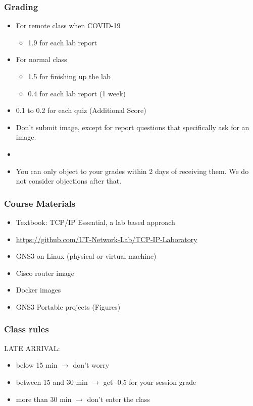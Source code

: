 \documentclass[15pt]{beamer}
\begin{document}
\begin{frame}
    \frametitle{Grading}

    \begin{itemize}
        \item For remote class when COVID-19
        \begin{itemize}
            \item {\color{red} 1.9} for each lab report
        \end{itemize}
        \item For normal class
        \begin{itemize}
            \item {\color{red} 1.5} for finishing up the lab
            \item {\color{red} 0.4} for each lab report (1 week)
        \end{itemize}
        \item {\color{red} 0.1} to {\color{red} 0.2} for each quiz (Additional Score)
        \item Don’t submit image, except for report questions that specifically ask for an image.
        \item 
        \item You can only object to your grades within {\color{red} 2 days} of receiving them. We do not consider objections after that. 
        
    \end{itemize}

\end{frame}

\begin{frame}
    \frametitle{Course Materials}

    \begin{itemize}
        \item Textbook: TCP/IP Essential, a lab based approach
        \item \url{https://github.com/UT-Network-Lab/TCP-IP-Laboratory}
        \item GNS3 on Linux (physical or virtual machine)
        \item Cisco router image
        \item Docker images
        \item GNS3 Portable projects (Figures)
    \end{itemize}

\end{frame}

\begin{frame}
    \frametitle{Class rules}

    LATE ARRIVAL:
    \begin{itemize}
        \item below 15 min $\rightarrow$ don’t worry
        \item {\color{orange} between 15 and 30 min $\rightarrow$ get -0.5 for your session grade}
        \item {\color{red} more than 30 min $\rightarrow$ don’t enter the class}
    \end{itemize}

\end{frame}
\end{document}
